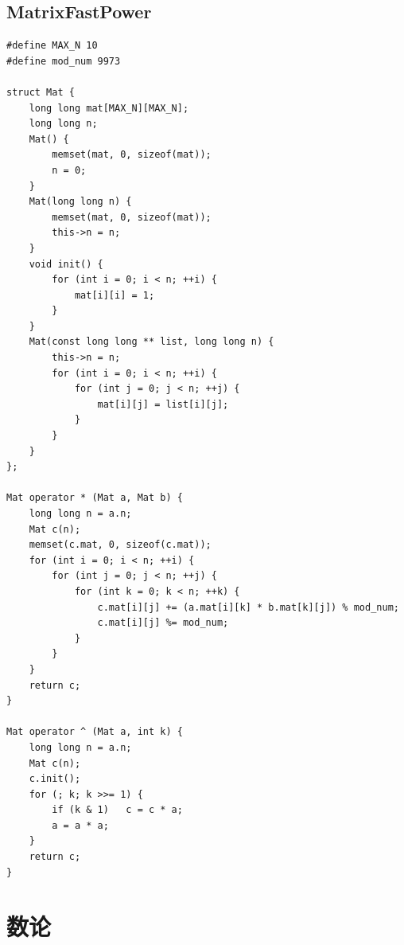 \documentclass[twoside]{article}
\begin{document}
\subsection{MatrixFastPower}
\begin{lstlisting}
#define MAX_N 10
#define mod_num 9973

struct Mat {
	long long mat[MAX_N][MAX_N];
	long long n;
	Mat() {
		memset(mat, 0, sizeof(mat));
		n = 0;
	}
	Mat(long long n) {
		memset(mat, 0, sizeof(mat));
		this->n = n;
	}
	void init() {
		for (int i = 0; i < n; ++i) {
			mat[i][i] = 1;
		}
	}
	Mat(const long long ** list, long long n) {
		this->n = n;
		for (int i = 0; i < n; ++i) {
			for (int j = 0; j < n; ++j) {
				mat[i][j] = list[i][j];
			}
		}
	}
};

Mat operator * (Mat a, Mat b) {
	long long n = a.n;
	Mat c(n);
	memset(c.mat, 0, sizeof(c.mat));
	for (int i = 0; i < n; ++i) {
		for (int j = 0; j < n; ++j) {
			for (int k = 0; k < n; ++k) {
				c.mat[i][j] += (a.mat[i][k] * b.mat[k][j]) % mod_num;
				c.mat[i][j] %= mod_num;
			}
		}
	}
	return c;
}

Mat operator ^ (Mat a, int k) {
	long long n = a.n;
	Mat c(n);
	c.init();
	for (; k; k >>= 1) {
		if (k & 1)   c = c * a;
		a = a * a;
	}
	return c;
}\end{lstlisting}
\clearpage\section{数论}
\end{document}
